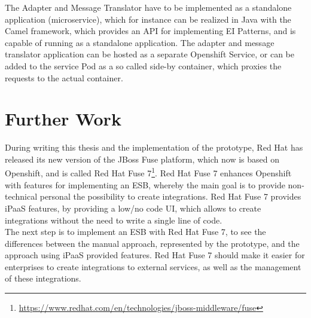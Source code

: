 The Adapter and Message Translator have to be implemented as a standalone application (microservice), which for instance can be realized in Java with the Camel framework, which provides an API for implementing EI Patterns, and is capable of running as a standalone application. The adapter and message translator application can be hosted as a separate Openshift Service, or can be added to the service Pod as a so called side-by container, which proxies the requests to the actual container.  \\

\section{Further Work}
\label{sec:esbd-furhter-work}
During writing this thesis and the implementation of the prototype, Red Hat has released its new version of the JBoss Fuse platform, which now is based on Openshift, and is called Red Hat Fuse 7\footnote{\url{https://www.redhat.com/en/technologies/jboss-middleware/fuse}}. Red Hat Fuse 7 enhances Openshift with features for implementing an ESB, whereby the main goal is to provide non-technical personal the possibility to create integrations. Red Hat Fuse 7 provides iPaaS features, by providing a low/no code UI, which allows to create integrations without the need to write a single line of code. \\

The next step is to implement an ESB with Red Hat Fuse 7, to see the differences between the manual approach, represented by the prototype, and the approach using iPaaS provided features. Red Hat Fuse 7 should make it easier for enterprises to create integrations to external services, as well as the management of these integrations.   